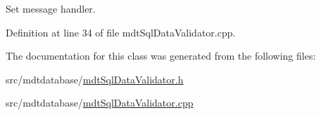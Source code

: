 Set message handler. 



Definition at line 34 of file mdt\-Sql\-Data\-Validator.\-cpp.



The documentation for this class was generated from the following files\-:\begin{DoxyCompactItemize}
\item 
src/mdtdatabase/\hyperlink{mdt_sql_data_validator_8h}{mdt\-Sql\-Data\-Validator.\-h}\item 
src/mdtdatabase/\hyperlink{mdt_sql_data_validator_8cpp}{mdt\-Sql\-Data\-Validator.\-cpp}\end{DoxyCompactItemize}
